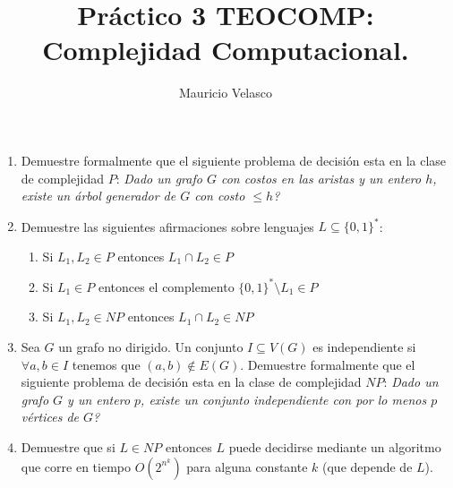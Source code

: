 \documentclass[12pt, a4paper]{article}
\date{}
\begin{document}
\title{Pr\'actico 3 TEOCOMP: Complejidad Computacional.}
\author{Mauricio Velasco}
\maketitle{}


\begin{enumerate}
\item Demuestre formalmente que el siguiente problema de decisión esta en la clase de complejidad $P$: {\it Dado un grafo $G$ con costos en las aristas y un entero $h$, existe un árbol generador de $G$ con costo $\leq h$?}

\item Demuestre las siguientes afirmaciones sobre lenguajes $L\subseteq \{0,1\}^*$:
\begin{enumerate}
\item Si $L_1,L_2\in P$ entonces $L_1\cap L_2\in P$
\item Si $L_1 \in P$ entonces el complemento $\{0,1\}^*\setminus L_1\in P$
\item Si $L_1,L_2\in NP$ entonces $L_1\cap L_2\in NP$
\end{enumerate}

\item Sea $G$ un grafo no dirigido. Un conjunto $I\subseteq V(G)$ es independiente si $\forall a,b\in I$ tenemos que $(a,b)\not\in E(G)$. Demuestre formalmente que el siguiente problema de decisión esta en la clase de complejidad $NP$: {\it Dado un grafo $G$ y un entero $p$, existe un conjunto independiente con por lo menos $p$ v\'ertices de $G$?}

\item Demuestre que si $L\in NP$ entonces $L$ puede decidirse mediante un algoritmo que corre en tiempo $O(2^{n^k})$ para alguna constante $k$ (que depende de $L$).



\end{enumerate}
\end{document}
